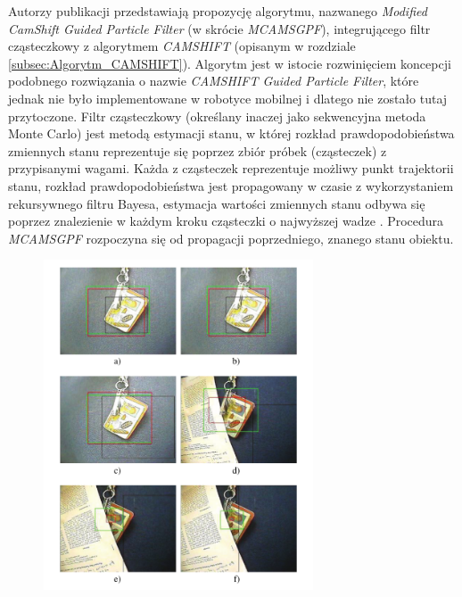 {Autorzy publikacji przedstawiają propozycję algorytmu, nazwanego \textit{Modified CamShift Guided Particle Filter} (w skrócie \textit{MCAMSGPF}), integrującego filtr cząsteczkowy z algorytmem \textit{CAMSHIFT} (opisanym w rozdziale \ref{subsec:Algorytm_CAMSHIFT}). Algorytm jest w istocie rozwinięciem koncepcji podobnego rozwiązania o nazwie \textit{CAMSHIFT Guided Particle Filter}, które jednak nie było implementowane w robotyce mobilnej i dlatego nie zostało tutaj przytoczone. Filtr cząsteczkowy (określany inaczej jako sekwencyjna metoda Monte Carlo) jest metodą estymacji stanu, w której rozkład prawdopodobieństwa zmiennych stanu reprezentuje się poprzez zbiór próbek (cząsteczek) z przypisanymi wagami. Każda z cząsteczek reprezentuje możliwy punkt trajektorii stanu, rozkład prawdopodobieństwa jest propagowany w czasie z wykorzystaniem rekursywnego filtru Bayesa, estymacja wartości zmiennych stanu odbywa się poprzez znalezienie w każdym kroku cząsteczki o najwyższej wadze \cite{Chou2012}. Procedura \textit{MCAMSGPF} rozpoczyna się od propagacji poprzedniego, znanego stanu obiektu.
\begin{figure}[!htb]
	\begin{center}
		\includegraphics[width=8cm]{images/tracking_example_zhang.png}
	\end{center}	
\label{fig:Przyklad_sledzenia_Zhang}
\end{figure}

}
